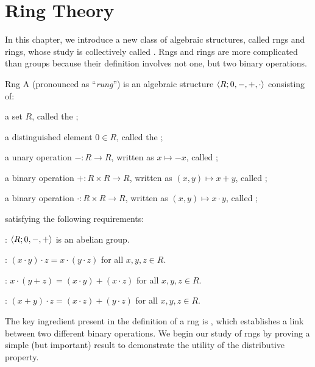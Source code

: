 
\chapter{Ring Theory}

In this chapter, we introduce a new class of algebraic structures, called rngs and rings, whose study is collectively called . Rngs and rings are more complicated than groups because their definition involves not one, but two binary operations.

\begin{dfnbox}{Rng}
	A  (pronounced as ``\textit{rung}'') is an algebraic structure ${\langle {R; 0, -, +, \cdot} \rangle}$ consisting of:
	\begin{dfnitems}
		\item a set $R$, called the ;
		\item a distinguished element $0 \in R$, called the ;
		\item a unary operation $-: R \to R$, written as $x \mapsto -x$, called ;
		\item a binary operation $+: R \times R \to R$, written as $(x, y) \mapsto x + y$, called ;
		\item a binary operation $\cdot: R \times R \to R$, written as $(x, y) \mapsto x \cdot y$, called ;
	\end{dfnitems}
	satisfying the following requirements:
	\begin{dfnitems}
		\item {}: ${\langle {R; 0, -, +} \rangle}$ is an abelian group.
		\item {}: $(x \cdot y) \cdot z = x \cdot (y \cdot z)$ for all $x, y, z \in R$.
		\item {}: $x \cdot (y + z) = (x \cdot y) + (x \cdot z)$ for all $x, y, z \in R$.
		\item {}: $(x + y) \cdot z = (x \cdot z) + (y \cdot z)$ for all $x, y, z \in R$.
	\end{dfnitems}
\end{dfnbox}

The key ingredient present in the definition of a rng is , which establishes a link between two different binary operations. We begin our study of rngs by proving a simple (but important) result to demonstrate the utility of the distributive property.

